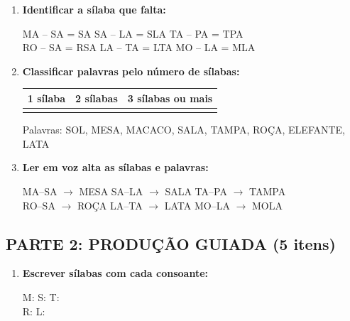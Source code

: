 \begin{exercicio}
\begin{enumerate}
  \item \textbf{Identificar a sílaba que falta:}
  \begin{center}
  MA -- SA = \underline{\hspace{1cm}}SA \quad SA -- LA = S\underline{\hspace{1cm}}LA \quad TA -- PA = T\underline{\hspace{1cm}}PA \\
  RO -- SA = R\underline{\hspace{1cm}}SA \quad LA -- TA = L\underline{\hspace{1cm}}TA \quad MO -- LA = M\underline{\hspace{1cm}}LA
  \end{center}

  \item \textbf{Classificar palavras pelo número de sílabas:}
  \begin{center}
  \begin{tabular}{|c|c|c|}
  \hline
  1 sílaba & 2 sílabas & 3 sílabas ou mais \\
  \hline
  \underline{\hspace{3cm}} & \underline{\hspace{3cm}} & \underline{\hspace{3cm}} \\
  \hline
  \end{tabular}
  \end{center}
  Palavras: SOL, MESA, MACACO, SALA, TAMPA, ROÇA, ELEFANTE, LATA

  \item \textbf{Ler em voz alta as sílabas e palavras:}
  \begin{center}
  MA--SA $\rightarrow$ MESA \quad SA--LA $\rightarrow$ SALA \quad TA--PA $\rightarrow$ TAMPA \\
  RO--SA $\rightarrow$ ROÇA \quad LA--TA $\rightarrow$ LATA \quad MO--LA $\rightarrow$ MOLA
  \end{center}
\end{enumerate}

\subsection*{PARTE 2: PRODUÇÃO GUIADA (5 itens)}

\begin{enumerate}[resume]
  \item \textbf{Escrever sílabas com cada consoante:}
  \begin{center}
  M: \underline{\hspace{3cm}} \quad S: \underline{\hspace{3cm}} \quad T: \underline{\hspace{3cm}} \\
  R: \underline{\hspace{3cm}} \quad L: \underline{\hspace{3cm}}
  \end{center}


\end{enumerate}
\end{exercicio}
